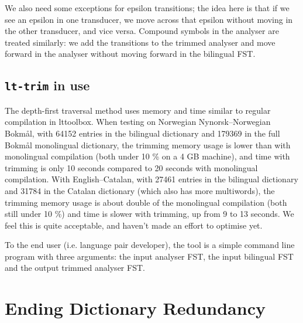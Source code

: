 \documentclass[10pt, a4paper]{article}
\newcommand{\tool}[1]{\texttt{#1}}
\begin{document}

We also need some exceptions for epsilon transitions; the idea here is
that if we see an epsilon in one transducer, we move across that
epsilon without moving in the other transducer, and vice versa.
Compound symbols in the analyser are treated similarly: we add the
transitions to the trimmed analyser and move forward in the analyser
without moving forward in the bilingual FST.

\subsection{\tool{lt-trim} in use}

The depth-first traversal method uses memory and time similar to
regular compilation in lttoolbox. When testing on Norwegian
Nynorsk--Norwegian Bokmål, with 64152 entries in the bilingual
dictionary and 179369 in the full Bokmål monolingual dictionary, the
trimming memory usage is lower than with monolingual compilation (both
under 10 \% on a 4 GB machine), and time with trimming is only 10
seconds compared to 20 seconds with monolingual compilation. With
English--Catalan, with 27461 entries in the bilingual dictionary and
31784 in the Catalan dictionary (which also has more multiwords), the
trimming memory usage is about double of the monolingual compilation
(both still under 10 \%) and time is slower with trimming, up from 9
to 13 seconds. We feel this is quite acceptable, and haven't made an
effort to optimise yet.

To the end user (i.e. language pair developer), the tool is a simple
command line program with three arguments: the input analyser FST, the
input bilingual FST and the output trimmed analyser FST.

\section{Ending Dictionary Redundancy}
\end{document}
